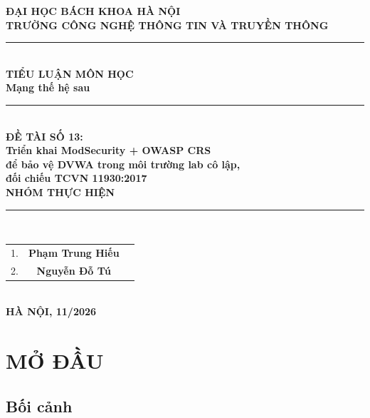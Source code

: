 \documentclass[12pt,a4paper,twoside]{report}
\begin{document}
\thispagestyle{empty}
\begin{titlepage}
\begin{center}
\textbf{\large ĐẠI HỌC BÁCH KHOA HÀ NỘI}\\[0.1cm]
\textbf{\large TRƯỜNG CÔNG NGHỆ THÔNG TIN VÀ TRUYỀN THÔNG}\\[1.5cm]
\noindent\rule{\textwidth}{1pt}\\[0.5cm]
\textbf{\Large TIỂU LUẬN MÔN HỌC}\\[0.5cm]
\textbf{\Large Mạng thế hệ sau}\\[1cm]
\noindent\rule{\textwidth}{1pt}\\[1cm]
\textbf{\Large ĐỀ TÀI SỐ 13:}\\[0.4cm]
\textbf{\Large Triển khai ModSecurity + OWASP CRS}\\[0.2cm]
\textbf{\Large để bảo vệ DVWA trong môi trường lab cô lập,}\\[0.2cm]
\textbf{\Large đối chiếu TCVN 11930:2017}\\[1.5cm]
\textbf{\large NHÓM THỰC HIỆN}\\[0.3cm]
\noindent\rule{5cm}{0.5pt}\\[0.5cm]
\begin{tabular}{ccl}
1. & \textbf{Phạm Trung Hiếu} \\
2. & \textbf{Nguyễn Đỗ Tú} & \\
\end{tabular}\\[1.5cm]
\vfill
\textbf{HÀ NỘI, 11/2026}
\end{center}
\end{titlepage}

\tableofcontents
\thispagestyle{empty}
\newpage

\listoffigures
{}
\newpage
\listoftables
{}
\newpage

\chapter{MỞ ĐẦU}

\section{Bối cảnh}
\end{document}
